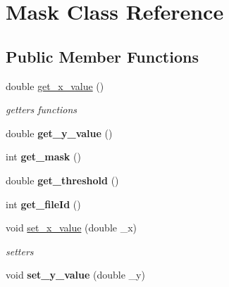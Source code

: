 \hypertarget{class_mask}{
\section{Mask Class Reference}
\label{class_mask}
}
\subsection*{Public Member Functions}
\begin{DoxyCompactItemize}
\item 
\hypertarget{class_mask_a988c7ca8183da718480d0ab129cf6b57}{
double \hyperlink{class_mask_a988c7ca8183da718480d0ab129cf6b57}{get\_\-x\_\-value} ()}
\label{class_mask_a988c7ca8183da718480d0ab129cf6b57}

\begin{DoxyCompactList}\small\item\em getters functions \end{DoxyCompactList}\item 
\hypertarget{class_mask_a14d50b021a0913201957d7d25b27c5a2}{
double {\bfseries get\_\-y\_\-value} ()}
\label{class_mask_a14d50b021a0913201957d7d25b27c5a2}

\item 
\hypertarget{class_mask_a86702d04c05e88a74ed26d03738e27c8}{
int {\bfseries get\_\-mask} ()}
\label{class_mask_a86702d04c05e88a74ed26d03738e27c8}

\item 
\hypertarget{class_mask_a93e448dcd9d45882ad3a82b8ffcfbe7b}{
double {\bfseries get\_\-threshold} ()}
\label{class_mask_a93e448dcd9d45882ad3a82b8ffcfbe7b}

\item 
\hypertarget{class_mask_a031de304363ec92e8abc09cd26626cf8}{
int {\bfseries get\_\-fileId} ()}
\label{class_mask_a031de304363ec92e8abc09cd26626cf8}

\item 
\hypertarget{class_mask_aebbc38d251ee42ce22bb2e57a4877674}{
void \hyperlink{class_mask_aebbc38d251ee42ce22bb2e57a4877674}{set\_\-x\_\-value} (double \_\-x)}
\label{class_mask_aebbc38d251ee42ce22bb2e57a4877674}

\begin{DoxyCompactList}\small\item\em setters \end{DoxyCompactList}\item 
\hypertarget{class_mask_afcd42fac052be59ea5d2215bc9b6c632}{
void {\bfseries set\_\-y\_\-value} (double \_\-y)}
\label{class_mask_afcd42fac052be59ea5d2215bc9b6c632}


\end{DoxyCompactItemize}
